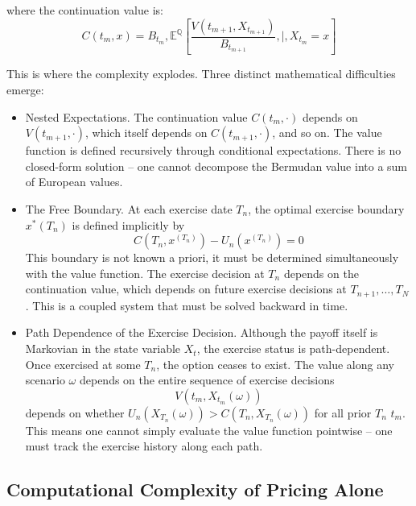  \noindent
  where the continuation value is:
  \begin{equation}
      C(t_m, x) = B_{t_m} ,\mathbb{E}^{\mathbb{Q}}\left[\frac{V(t_{m+1}, X_{t_{m+1}})}{B_{t_{m+1}}} ,\Big|, X_{t_m} = x\right]
  \end{equation}

   \noindent
  This is where the complexity explodes. Three distinct mathematical difficulties emerge:

    \begin{itemize}
        \item Nested Expectations. The continuation value $C(t_m, \cdot)$ depends on $V(t_{m+1}, \cdot)$, which itself depends on $C(t_{m+1}, \cdot)$, and so on. The value function is
        defined recursively through conditional expectations. There is no closed-form solution -- one cannot decompose the Bermudan value into a sum of European values.
       \item The Free Boundary. At each exercise date $T_n$, the optimal exercise boundary $x^*(T_n)$ is defined implicitly by 
       \begin{equation}
         C(T_n, x^(T_n)) - U_n(x^(T_n)) = 0   
       \end{equation}
       \noindent
       This boundary is not known a priori, it must be determined simultaneously with the value function. The exercise decision at $T_n$ depends on the continuation value, which depends on future exercise decisions at $T_{n+1}, \ldots, T_N$. This is a coupled system that must be solved backward in time.
       \item Path Dependence of the Exercise Decision. Although the payoff itself is Markovian in the state variable $X_t$, the exercise status is path-dependent. Once exercised at some $T_n$, the option ceases to exist. The value along any scenario $\omega$ depends on the entire sequence of exercise decisions
       \begin{equation}
          V(t_m, X_{t_m}(\omega))  
       \end{equation}
       depends on whether $U_n(X_{T_n}(\omega)) > C(T_n, X_{T_n}(\omega))$ for all prior  $T_n$ \leq $t_m$. 
     This means one cannot simply evaluate the value function pointwise -- one must track the exercise history along each path.
    \end{itemize}

\subsection{Computational Complexity of Pricing Alone}
